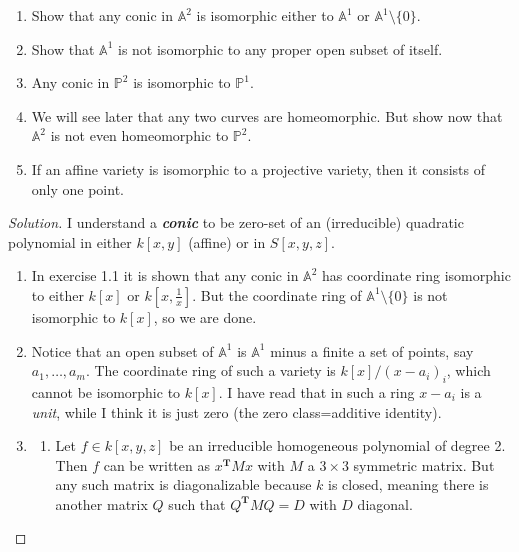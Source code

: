 \begin{manualexercise}{3.1}
\begin{enumerate}[label=\alph*.]
	\item Show that any conic in $\mathbb{A}^{2} $ is isomorphic either to $\mathbb{A}^{1} $ or $\mathbb{A}^{1}\setminus \{0\} $.

	\item Show that $\mathbb{A}^{1} $ is not isomorphic to any proper open subset of itself.

	\item Any conic in $\mathbb{P}^2$ is isomorphic to $\mathbb{P}^1$.

	\item We will see later that any two curves are homeomorphic. But show now that $\mathbb{A}^{2} $ is not even homeomorphic to $\mathbb{P}^2$.

	\item If an affine variety is isomorphic to a projective variety, then it consists of only one point.
\end{enumerate}

\begin{proof}[Solution] I understand a \textit{\textbf{conic}} to be zero-set of an (irreducible) quadratic polynomial in either $k[x,y]$ (affine) or in  $S[x,y,z]$.
	\begin{enumerate}[label=\alph*.]
		\item In exercise 1.1 it is shown that any conic in $\mathbb{A}^{2} $ has coordinate ring isomorphic to either $k[x]$ or $k[x,\frac{1}{x}]$. But the coordinate ring of  $\mathbb{A}^{1}\setminus \{0\} $ is not isomorphic to $k[x]$, so we are done.

		\item Notice that an open subset of $\mathbb{A}^{1}$ is $\mathbb{A}^{1} $ minus a finite a set of points, say $a_1,\ldots,a_m$. The coordinate ring of such a variety is $k[x]/(x-a_i)_{i}$, which cannot be isomorphic to $k[x]$. {\color{magenta}I have read that in such a ring $x-a_i$ is a \textit{unit}, while I think it is just zero (the zero class=additive identity).}

		\item \leavevmode 

			\begin{enumerate}[label=\textbf{Step \arabic*}]
				\item Let $f \in k[x,y,z]$ be an irreducible homogeneous polynomial of degree 2. Then  $f$ can be written as $x^{\mathbf{T}}Mx$ with $M$ a $3\times 3$ symmetric matrix. But any such matrix is diagonalizable because $k$ is closed, meaning there is another matrix $Q$ such that $Q^{\mathbf{T}}MQ=D$ with $D$ diagonal.


\end{enumerate}
\end{enumerate}
\end{proof}
\end{manualexercise}
